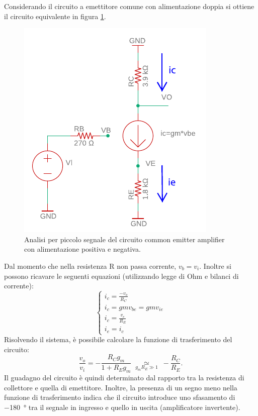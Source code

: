 \noindent
Considerando il circuito a emettitore comune con alimentazione doppia si ottiene il circuito equivalente in figura \ref{fig:commonemitter_AC}.
\begin{figure}[h!]
	\centering
	\includegraphics[width=0.4\linewidth]{./OtherFiles/Laboratorio 3/common emitter-piccolo segnale-printout}
	\caption{Analisi per piccolo segnale del circuito common emitter amplifier con alimentazione positiva e negativa.}
	\label{fig:commonemitter_AC}
\end{figure}
Dal momento che nella resistenza R non passa corrente, $v_b=v_i$. Inoltre si possono ricavare le seguenti equazioni (utilizzando legge di Ohm e bilanci di corrente):
\begin{equation}
	\begin{cases}
		i_c=\frac{-v_o}{R_C} \\
		i_c=gmv_{be}=gmv_{ie} \\
		i_c=\frac{v_e}{R_E} \\
		i_e=i_c
	\end{cases}
\end{equation}
Risolvendo il sistema, è possibile calcolare la funzione di trasferimento del circuito:
\begin{equation}
	\frac{v_o}{v_i}=-\frac{R_Cg_m}{1+R_Eg_m}\;\underset{g_mR_E\gg 1}{\simeq}\;-\frac{R_C}{R_E}.
\end{equation}
Il guadagno del circuito è quindi determinato dal rapporto tra la resistenza di collettore e quella di emettitore. Inoltre, la presenza di un segno meno nella funzione di trasferimento indica che il circuito introduce uno sfasamento di \SI{-180}{\degree} tra il segnale in ingresso e quello in uscita (amplificatore invertente). 

